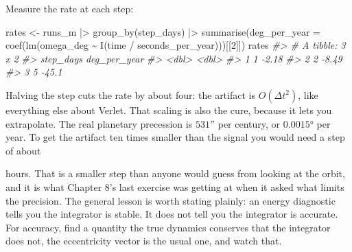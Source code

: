 \documentclass[
  10.5pt,
  letterpaper,
]{scrbook}
\newenvironment{Shaded}{\begin{snugshade}}{\end{snugshade}}
\newcommand{\AttributeTok}[1]{\textcolor[rgb]{0.00,0.00,0.00}{#1}}
\newcommand{\CommentTok}[1]{\textcolor[rgb]{0.00,0.00,0.00}{\textit{#1}}}
\newcommand{\DecValTok}[1]{\textcolor[rgb]{0.00,0.00,0.00}{#1}}
\newcommand{\FloatTok}[1]{\textcolor[rgb]{0.00,0.00,0.00}{#1}}
\newcommand{\FunctionTok}[1]{\textcolor[rgb]{0.00,0.00,0.00}{#1}}
\newcommand{\NormalTok}[1]{\textcolor[rgb]{0.00,0.00,0.00}{#1}}
\newcommand{\OtherTok}[1]{\textcolor[rgb]{0.00,0.00,0.00}{#1}}
\newcommand{\SpecialCharTok}[1]{\textcolor[rgb]{0.00,0.00,0.00}{#1}}
\theoremstyle{definition}
\theoremstyle{plain}
\theoremstyle{remark}
\begin{document}
Measure the rate at each step:

\begin{Shaded}
\begin{Highlighting}[]
\NormalTok{rates }\OtherTok{\textless{}{-}}\NormalTok{ runs\_m }\SpecialCharTok{|\textgreater{}}
  \FunctionTok{group\_by}\NormalTok{(step\_days) }\SpecialCharTok{|\textgreater{}}
  \FunctionTok{summarise}\NormalTok{(}\AttributeTok{deg\_per\_year =} \FunctionTok{coef}\NormalTok{(}\FunctionTok{lm}\NormalTok{(omega\_deg }\SpecialCharTok{\textasciitilde{}} \FunctionTok{I}\NormalTok{(time }\SpecialCharTok{/}\NormalTok{ seconds\_per\_year)))[[}\DecValTok{2}\NormalTok{]])}
\NormalTok{rates}
\CommentTok{\#\textgreater{} \# A tibble: 3 x 2}
\CommentTok{\#\textgreater{}   step\_days deg\_per\_year}
\CommentTok{\#\textgreater{}       \textless{}dbl\textgreater{}        \textless{}dbl\textgreater{}}
\CommentTok{\#\textgreater{} 1         1        {-}2.18}
\CommentTok{\#\textgreater{} 2         2        {-}8.49}
\CommentTok{\#\textgreater{} 3         5       {-}45.1}
\end{Highlighting}
\end{Shaded}

Halving the step cuts the rate by about four: the artifact is
\(O(\Delta t^2)\), like everything else about Verlet. That scaling is
also the cure, because it lets you extrapolate. The real planetary
precession is \(531''\) per century, or \(0.0015°\) per year. To get the
artifact ten times smaller than the signal you would need a step of
about

\begin{Shaded}
\end{Shaded}

hours. That is a smaller step than anyone would guess from looking at
the orbit, and it is what Chapter 8's last exercise was getting at when
it asked what limits the precision. The general lesson is worth stating
plainly: an energy diagnostic tells you the integrator is stable. It
does not tell you the integrator is accurate. For accuracy, find a
quantity the true dynamics conserves that the integrator does not, the
eccentricity vector is the usual one, and watch that.
\end{document}
